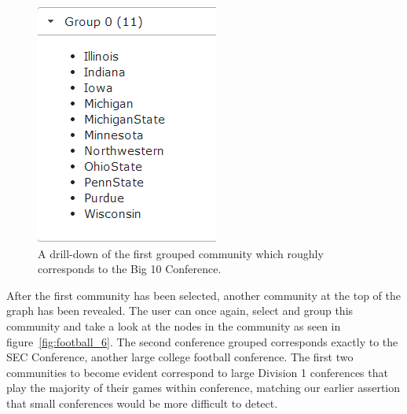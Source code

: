 \documentclass{article}\usepackage[]{graphicx}\usepackage[]{color}
\begin{document}
\begin{figure}[H]
\centering
\includegraphics[width=\textwidth]{images/football_5.png}
\caption{\label{fig:football_5} A drill-down of the first grouped community which roughly corresponds to the Big 10 Conference.}
\end{figure}

After the first community has been selected, another community at the top of the graph has been revealed. The user can once again, select and group this community and take a look at the nodes in the community as seen in figure~\ref{fig:football_6}. The second conference grouped corresponds exactly to the SEC Conference, another large college football conference. The first two communities to become evident correspond to large Division 1 conferences that play the majority of their games within conference, matching our earlier assertion that small conferences would be more difficult to detect.
\end{document}
